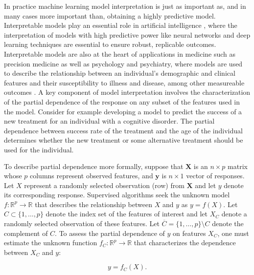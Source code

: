 \documentclass[12pt]{article}
\begin{document}
In practice machine learning model interpretation is just as important as, and in many cases more important than, obtaining a highly predictive model. Interpretable models play an essential role in artificial intelligence \citep{adadi2018peeking}, where the interpretation of models with high predictive power like neural networks and deep learning techniques are essential to ensure robust, replicable outcomes. Interpretable models are also at the heart of applications in medicine such as precision medicine as well as psychology and psychiatry, where models are used to describe the relationship between an individual's demographic and clinical features and their susceptibility to illness and disease, among other measureable outcomes \citep{dwyer2018machine, katuwal2016machine}. A key component of model interpretation involves the characterization of the partial dependence of the response on any subset of the features used in the model. Consider for example developing a model to predict the success of a new treatment for an individual with a cognitive disorder. The partial dependence between success rate of the treatment and the age of the individual determines whether the new treatment or some alternative treatment should be used for the individual. 

To describe partial dependence more formally, suppose that $\mathbf{X}$ is an $n \times p$ matrix whose $p$ columns represent observed features, and $\mathbf{y}$ is $n \times 1$ vector of responses. Let $X$ represent a randomly selected observation (row) from $\mathbf{X}$ and let $y$ denote its corresponding response. Supervised algorithms seek the unknown model $f:\mathbb{R}^{p} \rightarrow \mathbb{R}$ that describes the relationship between $X$ and $y$ as ${y} = f({X}).$ Let $C \subset \{1, \ldots, p\}$ denote the index set of the features of interest and let $X_C$ denote a randomly selected observation of these features. Let $\overline{C} = \{1, \ldots, p\} \setminus C$ denote the complement of $C$. To assess the partial dependence of $y$ on features $X_C$, one must estimate the unknown function $f_C: \mathbb{R}^{p} \rightarrow \mathbb{R}$ that characterizes the dependence between $X_C$ and $y$:

\begin{equation}\label{problem}
	y = f_C(X).
\end{equation}
\end{document}
